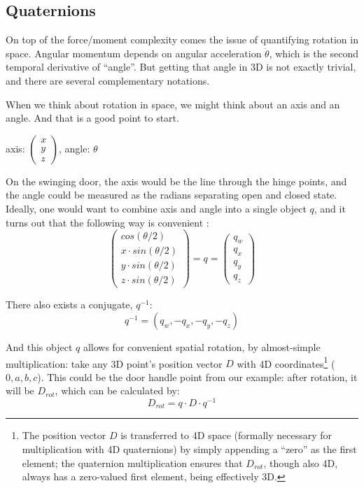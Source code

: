 \subsection{Quaternions}
\label{sec:org305c468}
On top of the force/moment complexity comes the issue of quantifying rotation in space.
Angular momentum depends on angular acceleration \(\ddot\theta\), which is the second temporal derivative of ``angle''.
But getting that angle in 3D is not exactly trivial, and there are several complementary notations.


When we think about rotation in space, we might think about an axis and an angle.
And that is a good point to start.

\begin{center}
axis: \(\begin{pmatrix}x\\y\\z \end{pmatrix}\), angle: \(\theta\)
\end{center}

On the swinging door, the axis would be the line through the hinge points, and the angle could be measured as the radians separating open and closed state.
Ideally, one would want to combine axis and angle into a single object \(q\), and it turns out that the following way is convenient \citep{Pennestri2010,Challis2020,Flashner2019}:
\begin{equation}\label{eqn:quaternion}
\begin{pmatrix}cos(\theta/2)\\x\cdot sin(\theta/2)\\y\cdot sin(\theta/2)\\z\cdot sin(\theta/2) \end{pmatrix} = q = \begin{pmatrix}q_w\\q_x\\q_y\\q_z \end{pmatrix}
\end{equation}

There also exists a conjugate, \(q^{-1}\):
\[q^{-1} = (q_w, -q_x, -q_y, -q_z)\]


And this object \(q\) allows for convenient spatial rotation, by almost-simple multiplication:
take any 3D point's position vector \(D\) with 4D coordinates\footnote{The position vector \(D\) is transferred to 4D space (formally necessary for multiplication with 4D quaternions) by simply appending a ``zero'' as the first element; the quaternion multiplication ensures that \(D_{rot}\), though also 4D, always has a zero-valued first element, being effectively 3D.} (\(0, a, b, c\)).
This could be the door handle point from our example: after rotation, it will be \(D_{rot}\), which can be calculated by:
\[D_{rot} = q\cdot D\cdot q^{-1}\]


